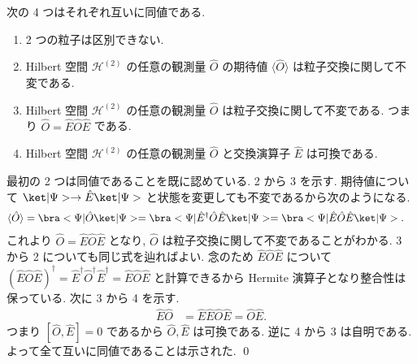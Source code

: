 \documentclass[uplatex,dvipdfmx,a4paper,11pt]{jlreq}
\makeatletter
\newcommand{\HH}{\mathcal{H}}
\numberwithin{equation}{section}
\theoremstyle{definition}
\renewenvironment{proof}[1][\proofname]{\par
  \normalfont
  \topsep6\p@\@plus6\p@ \trivlist
  \item[\hskip\labelsep{\bfseries #1}\@addpunct{\bfseries}]\ignorespaces\quad\par
}{%
  \qed\endtrivlist\@endpefalse
}
\renewcommand\proofname{証明}
\makeatother
\begin{document}
\begin{proposition}
  次の 4 つはそれぞれ互いに同値である.
  \begin{enumerate}
    \item 2 つの粒子は区別できない.
    \item Hilbert 空間 $\HH^{(2)}$ の任意の観測量 $\hat{O}$ の期待値 $\langle\hat{O}\rangle$ は粒子交換に関して不変である.
    \item Hilbert 空間 $\HH^{(2)}$ の任意の観測量 $\hat{O}$ は粒子交換に関して不変である. つまり $\hat{O} = \hat{E}\hat{O}\hat{E}$ である.
    \item Hilbert 空間 $\HH^{(2)}$ の任意の観測量 $\hat{O}$ と交換演算子 $\hat{E}$ は可換である.
  \end{enumerate}
\end{proposition}
\begin{proof}
  最初の 2 つは同値であることを既に認めている. 2 から 3 を示す. 期待値について $\ket|\Psi> \to \hat{E}\ket|\Psi>$ と状態を変更しても不変であるから次のようになる.
  \begin{align}
    \langle\hat{O}\rangle & = \bra<\Psi|\hat{O}\ket|\Psi> = \bra<\Psi|\hat{E}^\dagger\hat{O}\hat{E}\ket|\Psi> = \bra<\Psi|\hat{E}\hat{O}\hat{E}\ket|\Psi>.
  \end{align}
  これより $\hat{O} = \hat{E}\hat{O}\hat{E}$ となり, $\hat{O}$ は粒子交換に関して不変であることがわかる. 3 から 2 についても同じ式を辿ればよい.
  念のため $\hat{E}\hat{O}\hat{E}$ について $(\hat{E}\hat{O}\hat{E})^\dagger = \hat{E}^\dagger\hat{O}^\dagger\hat{E}^\dagger = \hat{E}\hat{O}\hat{E}$ と計算できるから Hermite 演算子となり整合性は保っている.
  次に 3 から 4 を示す.
  \begin{align}
    \hat{E}\hat{O} & = \hat{E}\hat{E}\hat{O}\hat{E} = \hat{O}\hat{E}.
  \end{align}
  つまり $[\hat{O}, \hat{E}] = 0$ であるから $\hat{O}, \hat{E}$ は可換である. 逆に 4 から 3 は自明である.
  よって全て互いに同値であることは示された.
\end{proof}
\end{document}
